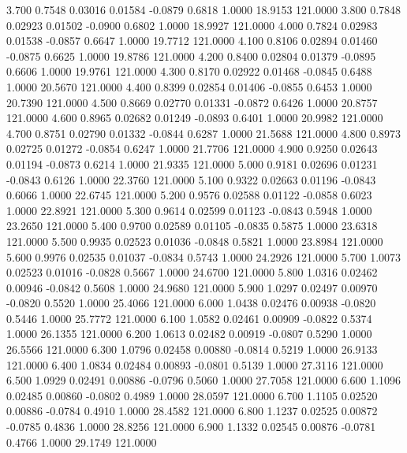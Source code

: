    3.700   0.7548   0.03016   0.01584  -0.0879   0.6818   1.0000  18.9153 121.0000
   3.800   0.7848   0.02923   0.01502  -0.0900   0.6802   1.0000  18.9927 121.0000
   4.000   0.7824   0.02983   0.01538  -0.0857   0.6647   1.0000  19.7712 121.0000
   4.100   0.8106   0.02894   0.01460  -0.0875   0.6625   1.0000  19.8786 121.0000
   4.200   0.8400   0.02804   0.01379  -0.0895   0.6606   1.0000  19.9761 121.0000
   4.300   0.8170   0.02922   0.01468  -0.0845   0.6488   1.0000  20.5670 121.0000
   4.400   0.8399   0.02854   0.01406  -0.0855   0.6453   1.0000  20.7390 121.0000
   4.500   0.8669   0.02770   0.01331  -0.0872   0.6426   1.0000  20.8757 121.0000
   4.600   0.8965   0.02682   0.01249  -0.0893   0.6401   1.0000  20.9982 121.0000
   4.700   0.8751   0.02790   0.01332  -0.0844   0.6287   1.0000  21.5688 121.0000
   4.800   0.8973   0.02725   0.01272  -0.0854   0.6247   1.0000  21.7706 121.0000
   4.900   0.9250   0.02643   0.01194  -0.0873   0.6214   1.0000  21.9335 121.0000
   5.000   0.9181   0.02696   0.01231  -0.0843   0.6126   1.0000  22.3760 121.0000
   5.100   0.9322   0.02663   0.01196  -0.0843   0.6066   1.0000  22.6745 121.0000
   5.200   0.9576   0.02588   0.01122  -0.0858   0.6023   1.0000  22.8921 121.0000
   5.300   0.9614   0.02599   0.01123  -0.0843   0.5948   1.0000  23.2650 121.0000
   5.400   0.9700   0.02589   0.01105  -0.0835   0.5875   1.0000  23.6318 121.0000
   5.500   0.9935   0.02523   0.01036  -0.0848   0.5821   1.0000  23.8984 121.0000
   5.600   0.9976   0.02535   0.01037  -0.0834   0.5743   1.0000  24.2926 121.0000
   5.700   1.0073   0.02523   0.01016  -0.0828   0.5667   1.0000  24.6700 121.0000
   5.800   1.0316   0.02462   0.00946  -0.0842   0.5608   1.0000  24.9680 121.0000
   5.900   1.0297   0.02497   0.00970  -0.0820   0.5520   1.0000  25.4066 121.0000
   6.000   1.0438   0.02476   0.00938  -0.0820   0.5446   1.0000  25.7772 121.0000
   6.100   1.0582   0.02461   0.00909  -0.0822   0.5374   1.0000  26.1355 121.0000
   6.200   1.0613   0.02482   0.00919  -0.0807   0.5290   1.0000  26.5566 121.0000
   6.300   1.0796   0.02458   0.00880  -0.0814   0.5219   1.0000  26.9133 121.0000
   6.400   1.0834   0.02484   0.00893  -0.0801   0.5139   1.0000  27.3116 121.0000
   6.500   1.0929   0.02491   0.00886  -0.0796   0.5060   1.0000  27.7058 121.0000
   6.600   1.1096   0.02485   0.00860  -0.0802   0.4989   1.0000  28.0597 121.0000
   6.700   1.1105   0.02520   0.00886  -0.0784   0.4910   1.0000  28.4582 121.0000
   6.800   1.1237   0.02525   0.00872  -0.0785   0.4836   1.0000  28.8256 121.0000
   6.900   1.1332   0.02545   0.00876  -0.0781   0.4766   1.0000  29.1749 121.0000
